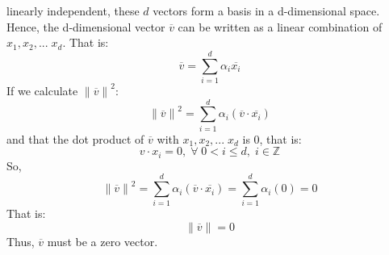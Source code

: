 \documentclass[12pt]{article}
\newcommand{\Z}{\mathbb{Z}}
\begin{document}
\begin{enumerate}[ref=\theenumi]
{            linearly independent, these $d$ vectors form a basis in a 
            d-dimensional space. Hence, the d-dimensional vector $\overline{v}$ 
            can be written as a linear combination of $x_1, x_2, ... \; x_d$. 
            That is:
            \[
                \overline{v} =  \sum_{i=1}^{d} \alpha_{i} \overline{x_i}
            \]
            If we calculate ${\lVert \overline{v} \rVert}^2$:
            \[
                {\lVert \overline{v} \rVert}^2 = 
                \sum_{i=1}^{d} \alpha_{i}(\overline{v} \cdot \overline{x_i})
            \]
            and that the dot product of $\overline{v}$ with $x_1, x_2, ... \; x_d$ 
            is 0, that is:
            \[
                v \cdot x_i = 0, \; \forall \; 0 < i \leq d,\; i \in \Z
            \]
            So,
            \[
                {\lVert \overline{v} \rVert}^2 = 
                \sum_{i=1}^{d} \alpha_{i}(\overline{v} \cdot \overline{x_i}) = 
                \sum_{i = 1}^d \alpha_{i}(0) = 0
            \]
            That is:
            \[
                \lVert \overline{v} \rVert = 0
            \]
            Thus, $\overline{v}$ must be a zero vector.

}
\end{enumerate}
\end{document}
